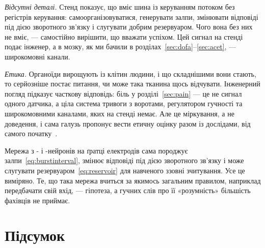 \emph{Відсутні деталі.} Стенд показує, що вміє шина  із керуванням потоком  без регістрів керування: самоорганізовуватися, генерувати залпи, змінювати відповіді під дією зворотного зв'язку і слугувати добрим резервуаром. Чого вона без них не вміє, --- самостійно вирішити, що вважати успіхом. Цей сигнал на стенді подає інженер, а в мозку, як ми бачили в розділах~\ref{sec:dofa}--\ref{sec:acet}, --- широкомовні канали.

\emph{Етика.} Органоїди вирощують із клітин людини, і що складнішими вони стають, то серйозніше постає питання, чи може така тканина щось відчувати. Інженерний погляд підказує часткову відповідь: біль у розділі~\ref{sec:pain} --- це не сигнал одного датчика, а ціла система тривоги з воротами, регулятором гучності та широкомовними каналами, яких на стенді немає. Але це міркування, а не доведення, і сама галузь пропонує вести етичну оцінку разом із дослідами, від самого початку~\cite{Smirnova2023}.

\begin{keyblock}
\begin{proposition}
\label{prop:livingmachine}
Мережа з - і -нейронів на ґратці електродів сама породжує залпи~\eqref{eq:burstinterval}, змінює відповіді під дією зворотного зв'язку і може слугувати резервуаром~\eqref{eq:reservoir} для навченого ззовні зчитування. Усе це виміряно. Те, що така мережа вчиться за якимось загальним правилом, наприклад передбачати свій вхід, --- гіпотеза, а гучних слів про її «розумність» більшість фахівців не приймає.
\end{proposition}
\end{keyblock}



\section{Підсумок}

